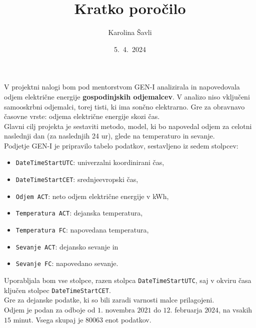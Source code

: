 \documentclass[a4paper, 10pt]{article}
\begin{document}
\title{\textbf{\LARGE{Kratko poročilo}}}
\author{Karolina Šavli}
\date{5.\ 4.\ 2024}

\maketitle


\noindent V projektni nalogi bom pod mentorstvom GEN-I analizirala in napovedovala odjem električne energije 
\textbf{gospodinjskih odjemalcev}. V analizo niso vključeni samooskrbni odjemalci, torej tisti, 
ki ima sončno elektrarno. Gre za obravnavo časovne vrste: odjema električne energije skozi čas. \\

\noindent Glavni cilj projekta je sestaviti metodo, model, ki bo napovedal odjem za celotni naslednji dan (za naslednjih 24 ur), glede na temperaturo in sevanje. \\

\noindent Podjetje GEN-I je pripravilo tabelo podatkov, sestavljeno iz sedem stolpcev:
\begin{itemize}
    \item  \texttt{DateTimeStartUTC}: univerzalni koordinirani čas,
    \item  \texttt{DateTimeStartCET}: srednjeevropski čas,
    \item  \texttt{Odjem ACT}: neto odjem električne energije v kWh,
    \item  \texttt{Temperatura ACT}: dejanska temperatura, 
    \item  \texttt{Temperatura FC}: napovedana temperatura,
    \item  \texttt{Sevanje ACT}: dejansko sevanje in
    \item  \texttt{Sevanje FC}: napovedano sevanje. 
\end{itemize}

\noindent Uporabljala bom vse stolpce, razen stolpca \texttt{DateTimeStartUTC}, saj v 
okviru časa ključen stolpec \texttt{DateTimeStartCET}.  \\

\noindent Gre za dejanske podatke, ki so bili zaradi varnosti malce prilagojeni. \\

\noindent Odjem je podan za odboje od $1$. novembra $2021$ do $12$. februarja $2024$, na vsakih $15$ minut. Vsega skupaj je $80063$ enot podatkov. 
\end{document}
